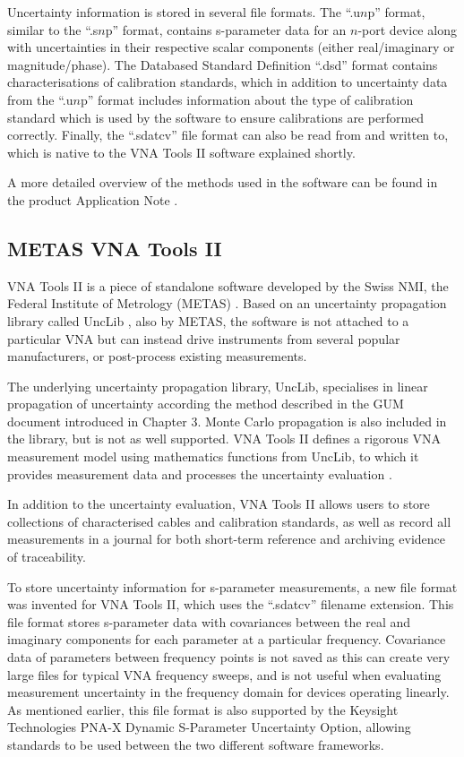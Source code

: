 \documentclass[../thesis/thesis.tex]{subfiles}
\begin{document}
\begin{refsection}
Uncertainty information is stored in several file formats. The ``.u$n$p'' format, similar to the ``.s$n$p'' format, contains s-parameter data for an $n$-port device along with uncertainties in their respective scalar components (either real/imaginary or magnitude/phase). The Databased Standard Definition ``.dsd'' format contains characterisations of calibration standards, which in addition to uncertainty data from the ``.u$n$p'' format includes information about the type of calibration standard which is used by the software to ensure calibrations are performed correctly. Finally, the ``.sdatcv'' file format can also be read from and written to, which is native to the VNA Tools II software explained shortly. 

A more detailed overview of the methods used in the software can be found in the product Application Note \cite{Keysight_2019}.

\subsection{METAS VNA Tools II}

VNA Tools II is a piece of standalone software developed by the Swiss NMI, the Federal Institute of Metrology (METAS) \cite{VNATools}. Based on an uncertainty propagation library called UncLib \cite{UncLib}, also by METAS, the software is not attached to a particular VNA but can instead drive instruments from several popular manufacturers, or post-process existing measurements.

The underlying uncertainty propagation library, UncLib, specialises in linear propagation of uncertainty according the method described in the GUM document introduced in Chapter 3. Monte Carlo propagation is also included in the library, but is not as well supported. VNA Tools II defines a rigorous VNA measurement model using mathematics functions from UncLib, to which it provides measurement data and processes the uncertainty evaluation \cite{Wollensack_2012}.

In addition to the uncertainty evaluation, VNA Tools II allows users to store collections of characterised cables and calibration standards, as well as record all measurements in a journal for both short-term reference and archiving evidence of traceability.

To store uncertainty information for s-parameter measurements, a new file format was invented for VNA Tools II, which uses the ``.sdatcv'' filename extension. This file format stores s-parameter data with covariances between the real and imaginary components for each parameter at a particular frequency. Covariance data of parameters between frequency points is not saved as this can create very large files for typical VNA frequency sweeps, and is not useful when evaluating measurement uncertainty in the frequency domain for devices operating linearly. As mentioned earlier, this file format is also supported by the Keysight Technologies PNA-X Dynamic S-Parameter Uncertainty Option, allowing standards to be used between the two different software frameworks.


\end{refsection}
\end{document}
